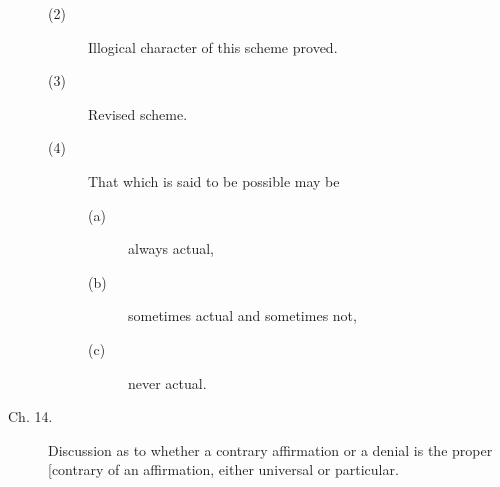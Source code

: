 \begin{description}
\begin{description}
\item[(2)] Illogical character of this scheme proved. 

\item[(3)] Revised scheme. 

\item[(4)] That which is said to be possible may be

\begin{description}
\item[(a)] always actual, 
\item[(b)] sometimes actual and sometimes not,
\item[(c)] never actual. 
\end{description}

\end{description}

\item[Ch. 14.] Discussion as to whether a contrary affirmation or a denial 
is the proper [contrary of an affirmation, either universal or 
particular. 

\end{description}

\renewcommand{\aref}{\arefC}
